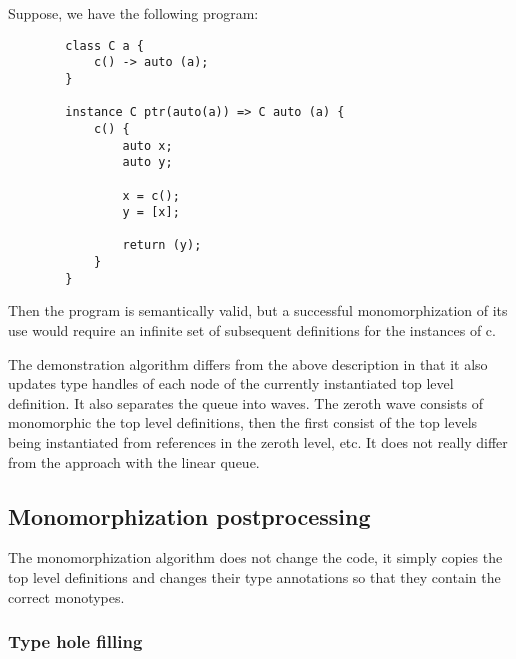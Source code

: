 \begin{ex}
    Suppose, we have the following program:

    \begin{lstlisting}
        class C a {
            c() -> auto (a);
        }

        instance C ptr(auto(a)) => C auto (a) {
            c() {
                auto x;
                auto y;

                x = c();
                y = [x];

                return (y);
            } 
        }
    \end{lstlisting}

    Then the program is semantically valid, but a successful monomorphization of its use would require an infinite set of subsequent definitions for the instances of c.


\end{ex}

The demonstration algorithm differs from the above description in that it also updates type handles  of each node of the currently instantiated top level definition. It also separates the queue into waves. The zeroth wave consists of monomorphic the top level definitions, then the first consist of the top levels being instantiated from references in the zeroth level, etc. It does not really differ from the approach with the linear queue. 



\subsection{Monomorphization postprocessing}

The monomorphization algorithm does not change the code, it simply copies the top level definitions and changes their type annotations so that they contain the correct monotypes.

\subsubsection{Type hole filling}

